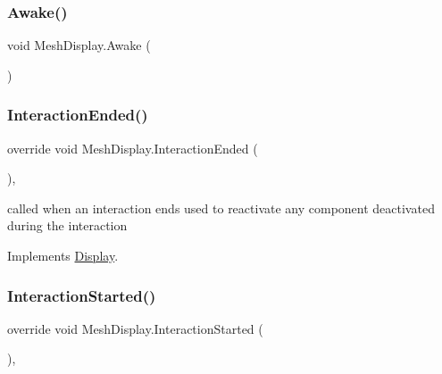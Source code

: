\subsubsection{\texorpdfstring{Awake()}{Awake()}}
{\footnotesize\ttfamily void Mesh\+Display.\+Awake (\begin{DoxyParamCaption}{ }\end{DoxyParamCaption})\hspace{0.3cm}{\ttfamily [private]}}

\mbox{\label{class_mesh_display_a23f7ab8b0f48536940ad1cc2145297b3}} 
\subsubsection{\texorpdfstring{Interaction\+Ended()}{InteractionEnded()}}
{\footnotesize\ttfamily override void Mesh\+Display.\+Interaction\+Ended (\begin{DoxyParamCaption}{ }\end{DoxyParamCaption})\hspace{0.3cm}{\ttfamily [protected]}, {\ttfamily [virtual]}}



called when an interaction ends used to reactivate any component deactivated during the interaction 



Implements \mbox{\hyperlink{class_display_a6fd38485267e1b78f1d1dfb589ec4ae0}{Display}}.

\mbox{\label{class_mesh_display_aa4affc65c23027c877f511fc2b8aaeb8}} 
\subsubsection{\texorpdfstring{Interaction\+Started()}{InteractionStarted()}}
{\footnotesize\ttfamily override void Mesh\+Display.\+Interaction\+Started (\begin{DoxyParamCaption}{ }\end{DoxyParamCaption})\hspace{0.3cm}{\ttfamily [protected]}, {\ttfamily [virtual]}}



